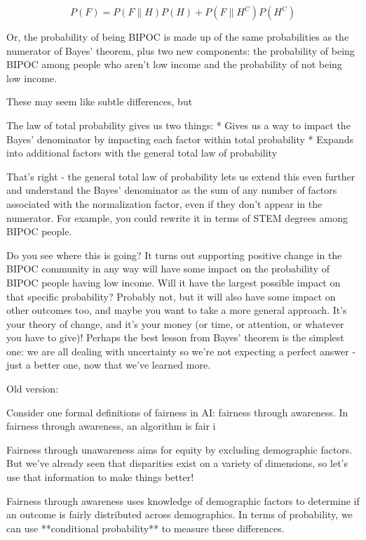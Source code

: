 \documentclass[12pt]{article}
\begin{document}
$$P(F) = P(F \| H) P(H) + P(F \| H^C) P(H^C)$$

Or, the probability of being BIPOC is made up of the same probabilities as the numerator of Bayes' theorem, plus two new components: the probability of being BIPOC among people who aren't low income and the probability of not being low income.

These may seem like subtle differences, but 

The law of total probability gives us two things:
* Gives us a way to impact the Bayes' denominator by impacting each factor within total probability
* Expands into additional factors with the general total law of probability

That's right - the general total law of probability lets us extend this even further and understand the Bayes' denominator as the sum of any number of factors associated with the normalization factor, even if they don't appear in the numerator. For example, you could rewrite it in terms of STEM degrees among BIPOC people.

Do you see where this is going? It turns out supporting positive change in the BIPOC community in any way will have some impact on the probability of BIPOC people having low income. Will it have the largest possible impact on that specific probability? Probably not, but it will also have some impact on other outcomes too, and maybe you want to take a more general approach. It's your theory of change, and it's your money (or time, or attention, or whatever you have to give)! Perhaps the best lesson from Bayes' theorem is the simplest one: we are all dealing with uncertainty so we're not expecting a perfect answer - just a better one, now that we've learned more.


\newpage
Old version:


Consider one formal definitions of fairness in AI: fairness through awareness.\cite{piech:fair}\cite{creel}\cite{Pessach} In fairness through awareness, an algorithm is fair i
 
Fairness through unawareness aims for equity by excluding demographic factors. But we've already seen that disparities exist on a variety of dimensions, so let's use that information to make things better!

Fairness through awareness uses knowledge of demographic factors to determine if an outcome is fairly distributed across demographics. In terms of probability, we can use **conditional probability** to measure these differences.
\end{document}

